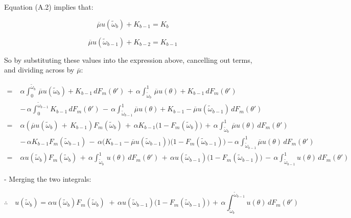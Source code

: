 Equation (A.2) implies that:

$$
\overline\mu u(\widetilde\omega_b) +K_{b-1}= K_b
$$

$$
\overline\mu u(\widetilde\omega_{b-1}) +K_{b-2}=K_{b-1}
$$

So by substituting these values into the expression above, cancelling out terms, and dividing across by $\overline\mu$:

\begin{equation*}
    \begin{aligned}
        =\;&\alpha \int^{\widetilde\omega_b}_0\,\overline\mu u(\widetilde\omega_b) +K_{b-1}\,dF_m(\theta') \,+\, \alpha \int^1_{\widetilde\omega_b}\,\overline\mu u(\theta) + K_{b-1}\,dF_m(\theta')\\ 
        & -\,\alpha \int^{\widetilde\omega_{b-1}}_0 K_{b-1}\,dF_m(\theta')  \,-\,\alpha \int^1_{\widetilde\omega_{b-1}} \overline\mu u(\theta) + K_{b-1}-\overline\mu u(\widetilde\omega_{b-1})\,dF_m(\theta')\\ 
        =\; &\alpha\left(\overline\mu u(\widetilde\omega_b) \,+\, K_{b-1}\right)F_m(\widetilde\omega_b) \,+\, \alpha K_{b-1}\Big(1-F_m(\widetilde\omega_b)\Big) \,+\, \alpha \int^1_{\widetilde\omega_b}\,\overline\mu u(\theta)\,dF_m(\theta')\\ 
        & -\,\alpha K_{b-1} F_m(\widetilde\omega_{b-1})  \,-\, \alpha \Big(K_{b-1}-\overline\mu u(\widetilde\omega_{b-1})\Big)\Big(1-F_m(\widetilde\omega_{b-1})\Big) - \alpha\int^1_{\widetilde\omega_{b-1}} \overline\mu u(\theta) \,dF_m(\theta')\\ 
        =\; &\alpha u(\widetilde\omega_b)F_m(\widetilde\omega_b) \, + \,\alpha \int^1_{\widetilde\omega_b}\, u(\theta)\,dF_m(\theta') \,+\,\alpha u(\widetilde\omega_{b-1})\Big(1  - F_m(\widetilde\omega_{b-1})\Big) \,-\, \alpha\int^1_{\widetilde\omega_{b-1}} u(\theta) \,dF_m(\theta')
    \end{aligned}
\end{equation*}

- Merging the two integrals:

$$
\therefore \quad u(\widetilde\omega_b)=\alpha   u(\widetilde\omega_b)F_m(\widetilde\omega_b) \,  \,+\,\alpha  u(\widetilde\omega_{b-1})\Big(1  - F_m(\widetilde\omega_{b-1})\Big) \,+\, \alpha\int^{\widetilde\omega_{b-1}}_{\widetilde\omega_b} u(\theta) \,dF_m(\theta') 
$$